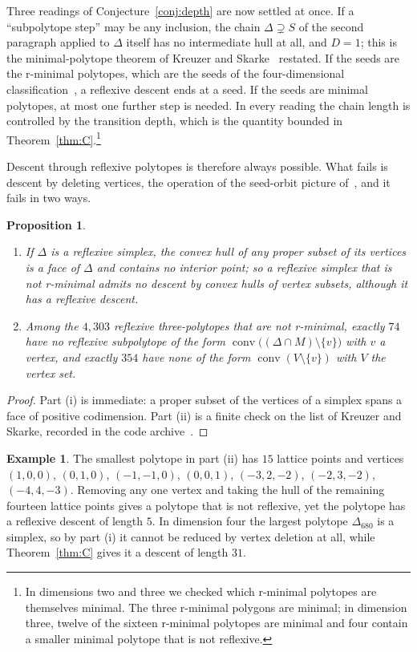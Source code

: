 \documentclass[11pt]{amsart}
\newtheorem{proposition}[theorem]{Proposition}
\theoremstyle{definition}
\newtheorem{example}[theorem]{Example}
\theoremstyle{remark}
\newcommand{\conv}{\operatorname{conv}}
\newcommand{\Dbig}{\Delta_{680}}
\newcommand{\DUB}{31}
\begin{document}
Three readings of Conjecture~\ref{conj:depth} are now settled at once. If
a ``subpolytope step'' may be any inclusion, the chain
$\Delta\supsetneq S$ of the second paragraph applied to $\Delta$ itself
has no intermediate hull at all, and $D=1$; this is the minimal-polytope
theorem of Kreuzer and Skarke~\cite{KS97} restated. If the seeds are the
r-minimal polytopes, which are the seeds of the four-dimensional
classification~\cite{KS00}, a reflexive descent ends at a seed. If the
seeds are minimal polytopes, at most one further step is needed. In every
reading the chain length is controlled by the transition depth, which is
the quantity bounded in Theorem~\ref{thm:C}.\footnote{In dimensions two and
three we checked which r-minimal polytopes are themselves minimal. The
three r-minimal polygons are minimal; in dimension three, twelve of the
sixteen r-minimal polytopes are minimal and four contain a smaller
minimal polytope that is not reflexive.}

Descent through reflexive polytopes is therefore always possible. What
fails is descent by deleting vertices, the operation of the seed-orbit
picture of~\cite{Bha26a}, and it fails in two ways.

\begin{proposition}\label{prop:vertexdeletion}
\begin{enumerate}[label=\textup{(\roman*)},leftmargin=*]
\item If $\Delta$ is a reflexive simplex, the convex hull of any proper
subset of its vertices is a face of $\Delta$ and contains no interior
point; so a reflexive simplex that is not r-minimal admits no descent by
convex hulls of vertex subsets, although it has a reflexive descent.
\item Among the $4{,}303$ reflexive three-polytopes that are not
r-minimal, exactly $74$ have no reflexive subpolytope of the form
$\conv\bigl((\Delta\cap M)\setminus\{v\}\bigr)$ with $v$ a vertex, and
exactly $354$ have none of the form $\conv(V\setminus\{v\})$ with $V$ the
vertex set.
\end{enumerate}
\end{proposition}

\begin{proof}
Part (i) is immediate: a proper subset of the vertices of a simplex spans
a face of positive codimension. Part (ii) is a finite check on the list of
Kreuzer and Skarke, recorded in the code archive~\cite{Repo}.
\end{proof}

\begin{example}\label{ex:vertexdeletion}
The smallest polytope in part (ii) has $15$ lattice points and vertices
$(1,0,0)$, $(0,1,0)$, $(-1,-1,0)$, $(0,0,1)$, $(-3,2,-2)$, $(-2,3,-2)$,
$(-4,4,-3)$. Removing any one vertex and taking the hull of the remaining
fourteen lattice points gives a polytope that is not reflexive, yet the
polytope has a reflexive descent of length $5$. In dimension four the
largest polytope $\Dbig$ is a simplex, so by part (i) it cannot be reduced
by vertex deletion at all, while Theorem~\ref{thm:C} gives it a descent of
length $\DUB$.
\end{example}
\end{document}
